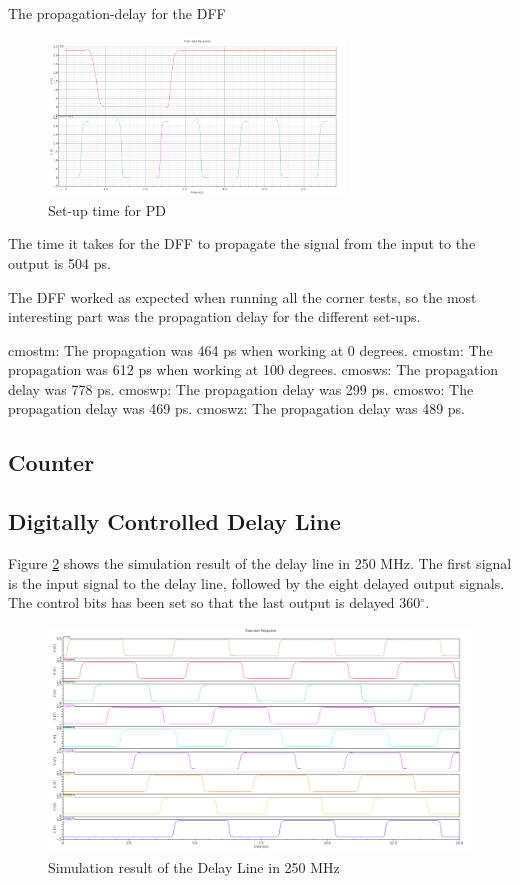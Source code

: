 \documentclass[a4paper,12pt]{article} \usepackage{graphicx}
\newcommand{\degree}{\ensuremath{^\circ}}
\begin{document}
The propagation-delay for the DFF 

\begin{figure}
\centering
\includegraphics[width=0.7\textwidth]{../Bilder/set_up_PD.png}
\caption{Set-up time for PD}
\label{fig:set_up_PD}
\end{figure}

The time it takes for the DFF to propagate the signal from the input to the output is 504 ps.

The DFF worked as expected when running all the corner tests, so the most interesting part was the propagation delay for
the different set-ups.

cmostm: The propagation was 464 ps when working at 0 degrees.
cmostm: The propagation was 612 ps when working at 100 degrees.
cmosws: The propagation delay was 778 ps.
cmoswp: The propagation delay was 299 ps.
cmoswo: The propagation delay was 469 ps.
cmoswz: The propagation delay was 489 ps.

\subsection{Counter}
\subsection{Digitally Controlled Delay Line}
Figure \ref{fig:delay_white} shows the simulation result of the delay line in
250 MHz. The first signal is the input signal to the delay line, followed by the
eight delayed output signals. The control bits has been set so that the last
output is delayed 360\degree . 
\begin{figure}[h]
        \centering
        \includegraphics[width=\textwidth]{../Bilder/Delay_Line/delay_trans_sim_white.png}
        \caption{Simulation result of the Delay Line in 250 MHz}
        \label{fig:delay_white}
\end{figure}
\end{document}
